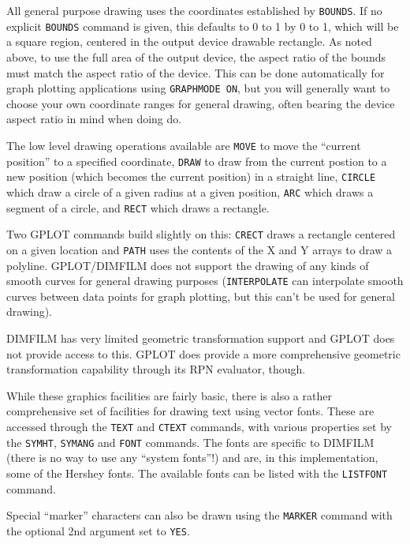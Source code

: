 \documentclass[a4paper,twoside,11pt]{article}
\newcommand{\newpara}{\par\vspace{4mm}\noindent}
\begin{document}
\newpara
All general purpose drawing uses the coordinates established by
\texttt{BOUNDS}. If no explicit \texttt{BOUNDS} command is given, this
defaults to 0 to 1 by 0 to 1, which will be a square region, centered in
the output device drawable rectangle. As noted above, to use the full
area of the output device, the aspect ratio of the bounds must match the
aspect ratio of the device. This can be done automatically for graph
plotting applications using \texttt{GRAPHMODE\ ON}, but you will
generally want to choose your own coordinate ranges for general drawing,
often bearing the device aspect ratio in mind when doing do.

\newpara
The low level drawing operations available are \texttt{MOVE} to move the
``current position'' to a specified coordinate, \texttt{DRAW} to draw
from the current postion to a new position (which becomes the current
position) in a straight line, \texttt{CIRCLE} which draw a circle of a
given radius at a given position, \texttt{ARC} which draws a segment of
a circle, and \texttt{RECT} which draws a rectangle.

\newpara
Two GPLOT commands build slightly on this: \texttt{CRECT} draws a
rectangle centered on a given location and \texttt{PATH} uses the
contents of the X and Y arrays to draw a polyline. GPLOT/DIMFILM does
not support the drawing of any kinds of smooth curves for general
drawing purposes (\texttt{INTERPOLATE} can interpolate smooth curves
between data points for graph plotting, but this can't be used for
general drawing).

\newpara
DIMFILM has very limited geometric transformation support and GPLOT does
not provide access to this. GPLOT does provide a more comprehensive
geometric transformation capability through its RPN evaluator, though.

\newpara
While these graphics facilities are fairly basic, there is also a rather
comprehensive set of facilities for drawing text using vector fonts.
These are accessed through the \texttt{TEXT} and \texttt{CTEXT}
commands, with various properties set by the \texttt{SYMHT},
\texttt{SYMANG} and \texttt{FONT} commands. The fonts are specific to
DIMFILM (there is no way to use any ``system fonts''!) and are, in this
implementation, some of the Hershey fonts. The available fonts can be
listed with the \texttt{LISTFONT} command.

\newpara
Special ``marker'' characters can also be drawn using the
\texttt{MARKER} command with the optional 2nd argument set to
\texttt{YES}.
\end{document}
